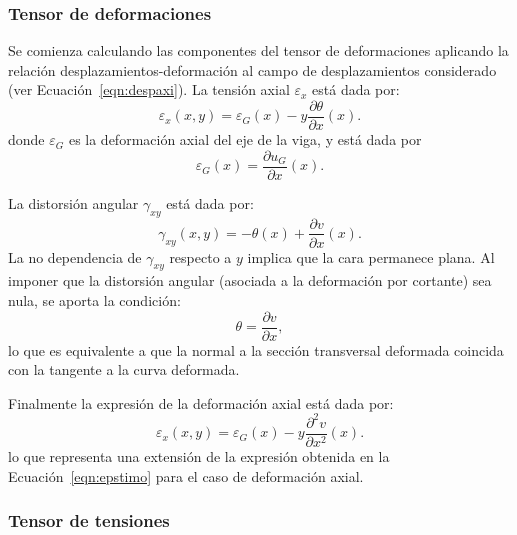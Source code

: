 \subsubsection{Tensor de deformaciones}

Se comienza calculando las componentes del tensor de deformaciones aplicando la relación desplazamientos-deformación al campo de desplazamientos considerado (ver Ecuación~\eqref{eqn:despaxi}). %
%
La tensión axial  $\varepsilon_x$ está dada por:
%
\begin{equation}\label{eqn:expdef}
\varepsilon_x(x,y) =  \varepsilon_G (x) -y \frac{\partial \theta}{\partial x}(x).
\end{equation}
%
donde $\varepsilon_G$ es la deformación axial del eje de la viga, y está dada por
%
\begin{equation}
\varepsilon_G(x) =  \frac{\partial u_G}{\partial x} (x) .
\end{equation}


La distorsión angular $\gamma_{xy}$ está dada por:
\begin{equation}
  \gamma_{xy}(x,y) = -\theta(x) + \frac{\partial v}{\partial x} (x).
\end{equation}
%
La no dependencia de $\gamma_{xy}$ respecto a $y$ implica que la cara permanece plana. %
%
Al imponer que la distorsión angular (asociada a la deformación por cortante) sea nula, se aporta la condición:
\begin{equation}
\boxed{
\theta = \frac{\partial v}{\partial x},
}
\end{equation}
lo que es equivalente a que la normal a la sección transversal deformada coincida con la tangente a la curva deformada.

Finalmente la expresión de la deformación axial está dada por:
%
\begin{equation}\label{eqn:epsdef}
\boxed{
\varepsilon_x(x,y) =  \varepsilon_G (x) -y \frac{\partial^2 v}{\partial x^2}(x).
}
\end{equation}
lo que representa una extensión de la expresión obtenida en la Ecuación~\eqref{eqn:epstimo} para el caso de deformación axial.




\subsubsection{Tensor de tensiones}

